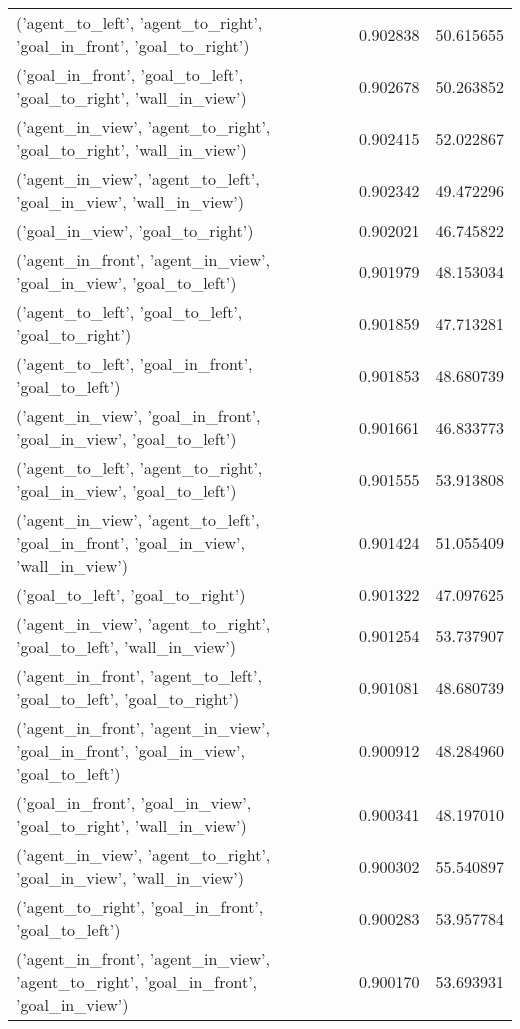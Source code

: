 \begin{tabular}{lrr}
('agent\_to\_left', 'agent\_to\_right', 'goal\_in\_front', 'goal\_to\_right') & 0.902838 & 50.615655 \\
('goal\_in\_front', 'goal\_to\_left', 'goal\_to\_right', 'wall\_in\_view') & 0.902678 & 50.263852 \\
('agent\_in\_view', 'agent\_to\_right', 'goal\_to\_right', 'wall\_in\_view') & 0.902415 & 52.022867 \\
('agent\_in\_view', 'agent\_to\_left', 'goal\_in\_view', 'wall\_in\_view') & 0.902342 & 49.472296 \\
('goal\_in\_view', 'goal\_to\_right') & 0.902021 & 46.745822 \\
('agent\_in\_front', 'agent\_in\_view', 'goal\_in\_view', 'goal\_to\_left') & 0.901979 & 48.153034 \\
('agent\_to\_left', 'goal\_to\_left', 'goal\_to\_right') & 0.901859 & 47.713281 \\
('agent\_to\_left', 'goal\_in\_front', 'goal\_to\_left') & 0.901853 & 48.680739 \\
('agent\_in\_view', 'goal\_in\_front', 'goal\_in\_view', 'goal\_to\_left') & 0.901661 & 46.833773 \\
('agent\_to\_left', 'agent\_to\_right', 'goal\_in\_view', 'goal\_to\_left') & 0.901555 & 53.913808 \\
('agent\_in\_view', 'agent\_to\_left', 'goal\_in\_front', 'goal\_in\_view', 'wall\_in\_view') & 0.901424 & 51.055409 \\
('goal\_to\_left', 'goal\_to\_right') & 0.901322 & 47.097625 \\
('agent\_in\_view', 'agent\_to\_right', 'goal\_to\_left', 'wall\_in\_view') & 0.901254 & 53.737907 \\
('agent\_in\_front', 'agent\_to\_left', 'goal\_to\_left', 'goal\_to\_right') & 0.901081 & 48.680739 \\
('agent\_in\_front', 'agent\_in\_view', 'goal\_in\_front', 'goal\_in\_view', 'goal\_to\_left') & 0.900912 & 48.284960 \\
('goal\_in\_front', 'goal\_in\_view', 'goal\_to\_right', 'wall\_in\_view') & 0.900341 & 48.197010 \\
('agent\_in\_view', 'agent\_to\_right', 'goal\_in\_view', 'wall\_in\_view') & 0.900302 & 55.540897 \\
('agent\_to\_right', 'goal\_in\_front', 'goal\_to\_left') & 0.900283 & 53.957784 \\
('agent\_in\_front', 'agent\_in\_view', 'agent\_to\_right', 'goal\_in\_front', 'goal\_in\_view') & 0.900170 & 53.693931 \\

\end{tabular}
